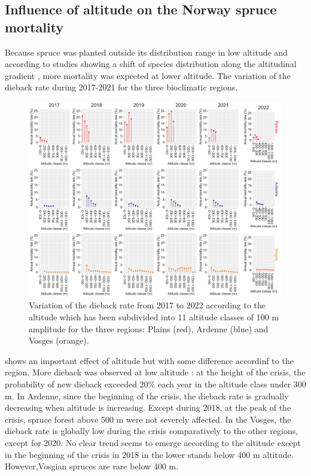 \documentclass[3p,procedia]{elsarticle}
\begin{document}
\subsection{ Influence of altitude on the Norway spruce mortality}
Because spruce was planted outside its distribution range in low altitude and according to studies showing a shift of species distribution along the altitudinal gradient \citep{lenoir_significant_2008}, more mortality was expected at lower altitude. 
The variation of the dieback rate during 2017-2021  for the three bioclimatic regions.
\begin{figure}[htbp] 
\centering
	\includegraphics[width=\textwidth]{synthese_color_11_2022.png}
     \caption{Variation of the dieback rate from 2017 to 2022 according to the altitude which has been subdivided into 11 altitude classes of 100 m amplitude for the three regions: Plains (red), Ardenne (blue) and Vosges (orange). 
}
	\label{alti_sco}
\end{figure}
shows an important effect of altitude but with some difference accordinf to the region. More dieback was observed at low altitude :  at the height of the crisis, the probability of new dieback exceeded 20\% each year in the altitude class under 300 m.
In Ardenne, since the beginning of the crisis, the dieback rate is gradually decreasing when altitude is increasing.
Except during 2018, at the peak of the crisis, spruce forest above 500 m were not severely affected.
In the Vosges, the dieback rate is globally low during the crisis comparatively to the other regions, except for 2020.
No clear trend seems to emerge according to the altitude except in the beginning of the crisis in 2018 in the lower stands below 400 m altitude.
However,Vosgian spruces are rare below 400 m.
\end{document}

